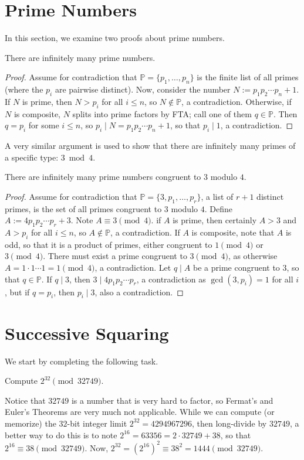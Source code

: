 \documentclass{article}
\begin{document}
\section{Prime Numbers}
In this section, we examine two proofs about prime numbers.

\begin{theorem}
There are infinitely many prime numbers.
\end{theorem}
\begin{proof}
Assume for contradiction that $\mathbb P = \{p_1, \ldots, p_n\}$ is the finite list of all primes (where the $p_i$ are pairwise distinct). Now, consider the number $N := p_1p_2\cdots p_n + 1$. If $N$ is prime, then $N > p_i$ for all $i\leq n$, so $N\not\in\mathbb P$, a contradiction. Otherwise, if $N$ is composite, $N$ splits into prime factors by FTA; call one of them $q\in \mathbb P$. Then $q = p_i$ for some $i\leq n$, so $p_i \mid N = p_1p_2\cdots p_n + 1$, so that $p_i\mid 1$, a contradiction.
\end{proof}

A very similar argument is used to show that there are infinitely many primes of a specific type: $3\bmod 4$.
\begin{theorem}
There are infinitely many prime numbers congruent to $3$ modulo $4$.
\end{theorem}
\begin{proof}
Assume for contradiction that $\mathbb P = \{3, p_1, \ldots, p_r\}$, a list of $r+1$ distinct primes, is the set of all primes congruent to $3$ modulo $4$. Define $A := 4p_1p_2\cdots p_r+3$. Note $A\equiv 3\pmod 4$. if $A$ is prime, then certainly $A>3$ and $A>p_i$ for all $i\leq n$, so $A\not\in\mathbb P$, a contradiction. If $A$ is composite, note that $A$ is odd, so that it is a product of primes, either congruent to $1\pmod 4$ or $3\pmod 4$. There must exist a prime congruent to $3\pmod 4$, as otherwise $A = 1\cdot 1\cdots 1 = 1\pmod 4$, a contradiction. Let $q\mid A$ be a prime congruent to $3$, so that $q\in\mathbb P$. If $q\mid 3$, then $3\mid 4p_1p_2\cdots p_r$, a contradiction as $\gcd(3, p_i) = 1$ for all $i$, but if $q = p_i$, then $p_i\mid 3$, also a contradiction.
\end{proof}

\setcounter{section}{77}
\section{Successive Squaring}
We start by completing the following task.
\begin{example}
Compute $2^{32}\pmod{32749}$.
\end{example}
\begin{solution}
Notice that $32749$ is a number that is very hard to factor, so Fermat's and Euler's Theorems are very much not applicable. While we can compute (or memorize) the $32$-bit integer limit $2^{32} = 4294967296$, then long-divide by $32749$, a better way to do this is to note $2^{16} = 63356 = 2\cdot 32749 + 38$, so that $2^{16} \equiv 38\pmod{32749}$. Now, $2^{32} = (2^{16})^2 \equiv 38^2 = \boxed{1444} \pmod{32749}$.
\end{solution}
\end{document}

